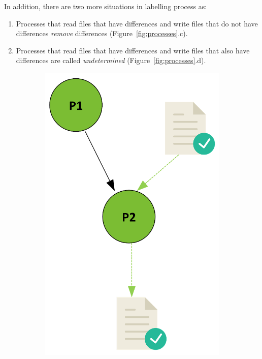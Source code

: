 \documentclass[a4paper,num-refs]{oup-contemporary}
\begin{document}
In addition, there are two more situations in labelling process as:
\begin{enumerate}
\item Processes that read files 
that have differences and write files that do not have differences \emph{remove} 
differences (Figure~\ref{fig:processes}.c).
\item Processes that read files that have differences and write files that 
also have differences are called
\emph{undetermined} (Figure~\ref{fig:processes}.d).
\end{enumerate}

\begin{figure}%
\centering
    \begin{subfigure}{0.2\linewidth}
        \includegraphics[scale=0.3]{images/green.png}

\end{subfigure}
\end{figure}
\end{document}
